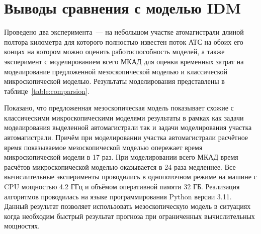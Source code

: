 \section{Выводы сравнения с моделью IDM}
Проведено два эксперимента~--- на небольшом участке атомагистрали длиной полтора километра для которого полностью известен поток АТС на обоих его концах на котором можно оценить работоспособность моделей, а также эксперимент с моделированием всего МКАД для оценки временных затрат на моделирование предложенной мезоскопической моделью и классической микроскопической моделью.
Результаты моделирования представлены в таблице~\ref{table:comparsion}.
\begin{table}[htbp]
    \centering
    \caption{Сравнение предложенной модели и модели разумного водителя.\label{table:comparsion}}
 \end{table}
Показано, что предложенная мезоскопическая модель показывает схожие с классическими микроскопическими моделями результаты в рамках как задачи моделирования выделенной автомагистрали так и задачи моделирования участка автомагистрали.
Причём при моделировании участка автомагистрали расчётное время показываемое мезоскопической моделью опережает время микроскопической модели в 17 раз.
При моделировании всего МКАД время расчётов микроскопической моделью оказывается в 24 раза медленнее.
Все вычислительные эксперименты проводились в однопоточном режиме на машине с CPU мощностью 4.2 ГГц и объёмом оперативной памяти 32 ГБ.
Реализация алгоритмов проводилась на языке программирования Python версии 3.11.
Данный результат позволяет использовать мезоскопическую модель в ситуациях когда необходим быстрый результат прогноза при ограниченных вычислительных мощностях.

\clearpage 